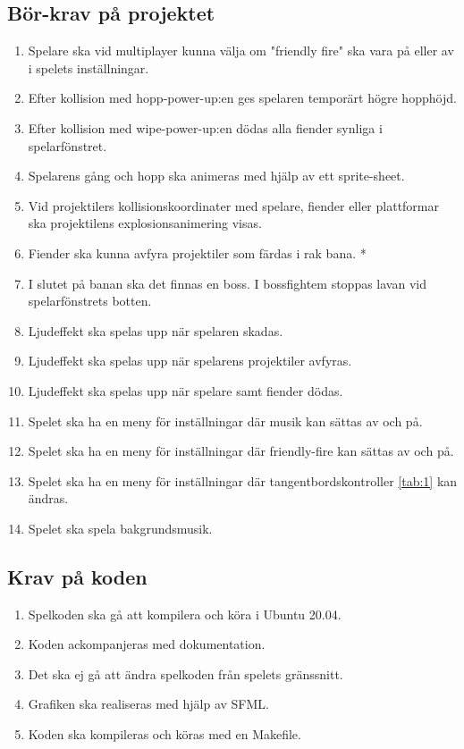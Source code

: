 \documentclass{TDP005mall}
\begin{document}
\subsection{Bör-krav på projektet}
\begin{enumerate}
\item Spelare ska vid multiplayer kunna välja om "friendly fire" ska vara på eller av i spelets inställningar. 
\item Efter kollision med hopp-power-up:en ges spelaren temporärt högre hopphöjd.
\item Efter kollision med wipe-power-up:en dödas alla fiender synliga i spelarfönstret.
\item Spelarens gång och hopp ska animeras med hjälp av ett sprite-sheet.
\item Vid projektilers kollisionskoordinater med spelare, fiender eller plattformar ska projektilens explosionsanimering visas.
\item Fiender ska kunna avfyra projektiler som färdas i rak bana. *
\item I slutet på banan ska det finnas en boss. I bossfightem stoppas lavan vid spelarfönstrets botten.
\item Ljudeffekt ska spelas upp när spelaren skadas.
\item Ljudeffekt ska spelas upp när spelarens projektiler avfyras.
\item Ljudeffekt ska spelas upp när spelare samt fiender dödas.
\item Spelet ska ha en meny för inställningar där musik kan sättas av och på.
\item Spelet ska ha en meny för inställningar där friendly-fire kan sättas av och på.
\item Spelet ska ha en meny för inställningar där tangentbordskontroller \ref{tab:1} kan ändras.
\item Spelet ska spela bakgrundsmusik.
\end{enumerate}

\subsection{Krav på koden} %
\begin{enumerate}
\item    Spelkoden ska gå att kompilera och köra i Ubuntu 20.04.
\item    Koden ackompanjeras med dokumentation.
\item    Det ska ej gå att ändra spelkoden från spelets gränssnitt.
\item    Grafiken ska realiseras med hjälp av SFML.
\item    Koden ska kompileras och köras med en Makefile.
\end{enumerate}
\end{document}

